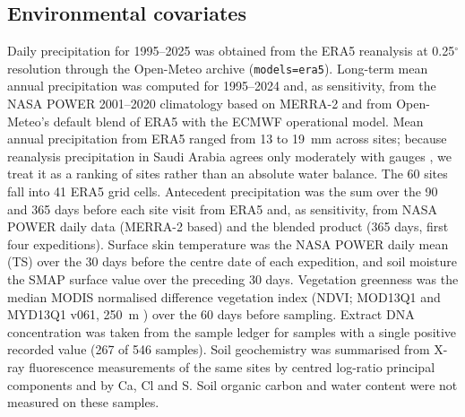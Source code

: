 \subsection*{Environmental covariates}
Daily precipitation for 1995--2025 was obtained from the ERA5 reanalysis \citep{hersbach2020era5} at
0.25$^\circ$ resolution through the Open-Meteo archive (\texttt{models=era5}). Long-term mean annual
precipitation was computed for 1995--2024 and, as sensitivity, from the NASA POWER 2001--2020 climatology
based on MERRA-2 \citep{gelaro2017merra2} and from Open-Meteo's default blend of ERA5 with the ECMWF
operational model. Mean annual precipitation from ERA5 ranged from 13 to 19~mm across sites; because
reanalysis precipitation in Saudi Arabia agrees only moderately with gauges \citep{wang2025sara}, we
treat it as a ranking of sites rather than an absolute water balance. The 60 sites fall into 41 ERA5 grid
cells. Antecedent precipitation was the sum over the 90 and 365 days before each site visit from ERA5 and,
as sensitivity, from NASA POWER daily data (MERRA-2 based) and the blended product (365 days, first four
expeditions). Surface skin temperature was the NASA POWER daily mean (TS) over the 30 days before the
centre date of each expedition, and soil moisture the SMAP surface value over the preceding 30 days. Vegetation greenness was the median MODIS normalised
difference vegetation index (NDVI; MOD13Q1 and MYD13Q1 v061, 250~m \citep{didan2021mod13q1}) over the 60
days before sampling. Extract DNA concentration was taken from the sample ledger for samples with a single
positive recorded value (267 of 546 samples). Soil geochemistry was summarised from X-ray fluorescence
measurements of the same sites by centred log-ratio principal components and by Ca, Cl and S. Soil organic
carbon and water content were not measured on these samples.

